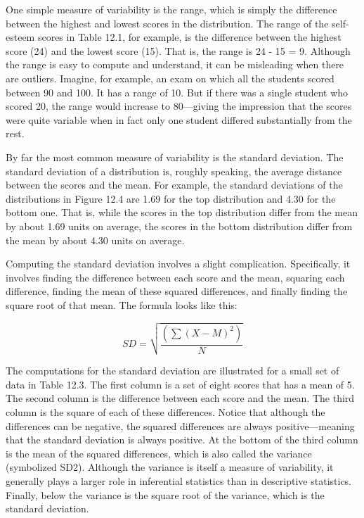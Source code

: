 One simple measure of variability is the range, which is simply the difference between the highest and lowest
scores in the distribution. The range of the self-esteem scores in Table 12.1, for example, is the difference between the highest score (24) and the lowest score (15). That is, the range is 24 - 15 = 9. Although the range is easy to compute and understand, it can be misleading when there are outliers. Imagine, for example, an exam on which all the students scored between 90 and 100. It has a range of 10. But if there was a single student who scored 20, the range would increase to 80---giving the impression that the scores were quite variable when in fact only one student differed substantially from the rest.


By far the most common measure of variability is the standard deviation. The standard deviation of a distribution is, roughly speaking, the average distance between the scores and the mean. For example, the standard deviations of the distributions in Figure 12.4 are 1.69 for the top distribution and 4.30 for the bottom one. That is, while the scores in the top distribution differ from the mean by about 1.69 units on average, the scores in the bottom distribution differ from the mean by about 4.30 units on average.


Computing the standard deviation involves a slight complication. Specifically, it involves finding the difference between each score and the mean, squaring each difference, finding the mean of these squared differences, and finally finding the square root of that mean. The formula looks like this:


\begin{equation}
SD=\sqrt{\frac{(\sum(X-M)^2)}{N}}
\end{equation}

The computations for the standard deviation are illustrated for a small set of data in Table 12.3. The first column is a set of eight scores that has a mean of 5. The second column is the difference between each score and the mean. The third column is the square of each of these differences. Notice that although the differences can be negative, the squared differences are always positive---meaning that the standard deviation is always positive. At the bottom of the third column is the mean of the squared differences, which is also called the variance (symbolized SD2). Although the variance is itself a measure of variability, it generally plays a larger role in inferential statistics than in descriptive statistics. Finally, below the variance is the square root of the variance, which is the standard deviation.


